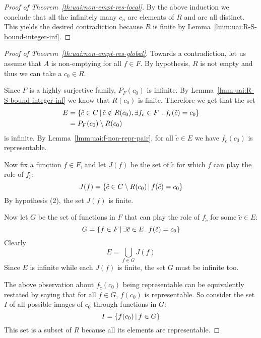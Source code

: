 \begin{proof}[Proof of Theorem~\ref{th:uai:non-empt-res-local}]
	By the above induction we conclude that all the infinitely many $c_n$ are elements of $R$ and are all distinct. This yields the desired contradiction because $R$ is finite by Lemma~\ref{lmm:uai:R-S-bound-integer-inf}.
\end{proof}

\begin{proof}[Proof of Theorem~\ref{th:uai:non-empt-res-global}]
	Towards a contradiction, let us assume that $A$ is non-emptying for all $f \in F$. By hypothesis, $R$ is not empty and thus we can take a $c_0 \in R$.

	Since $F$ is a highly surjective family, $P_F(c_0)$ is infinite. By Lemma~\ref{lmm:uai:R-S-bound-integer-inf} we know that $R(c_0)$ is finite. Therefore we get that the set
	\begin{align*}
		E & = \{ \tilde{c} \in C \,\vert\, \tilde{c} \notin R(c_0), \exists f_{\tilde{c}} \in F\ .\ f_{\tilde{c}}(\tilde{c}) = c_0 \} \\
		  & = P_F(c_0) \setminus R(c_0)
	\end{align*}
	is infinite. By Lemma~\ref{lmm:uai:f-non-repr-pair}, for all $\tilde{c} \in E$ we have $f_{\tilde{c}}(c_0)$ is representable.

	Now fix a function $f \in F$, and let $J(f)$ be the set of $\tilde{c}$ for which $f$ can play the role of $f_{\tilde{c}}$:
	\begin{equation*}
		J(f) = \{ \tilde{c} \in C \setminus R(c_0) \,\vert\, f(\tilde{c})=c_0 \}
	\end{equation*}
	By hypothesis (2), the set $J(f)$ is finite.

	Now let $G$ be the set of functions in $F$ that can play the role of $f_{\tilde{c}}$ for some $\tilde{c} \in E$:
	\begin{equation*}
		G = \{ f \in F \,\vert\, \exists \tilde{c}\in E.~f(\tilde{c})=c_0 \}
	\end{equation*}
	Clearly
	\begin{equation*}
		E = \bigcup\limits_{f \in G} J(f)
	\end{equation*}
	Since $E$ is infinite while each $J(f)$ is finite, the set $G$ must be infinite too.

	The above observation about $f_{\tilde{c}}(c_0)$ being representable can be equivalently restated by saying that for all $f \in G$, $f(c_0)$ is representable.
	So consider the set $I$ of all possible images of $c_0$ through functions in $G$:
	\begin{equation*}
		I = \{ f(c_0) \,\vert\, f \in G \}
	\end{equation*}
	This set is a subset of $R$ because all its elements are representable.


\end{proof}

